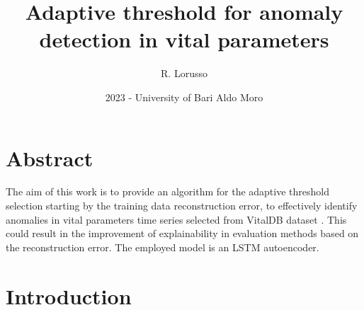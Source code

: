 \documentclass{article}
\begin{document}
	
	
\title{Adaptive threshold for anomaly detection in vital parameters}
\author{R. Lorusso}
\date{2023 - University of Bari Aldo Moro}
	
\maketitle
	
\begin{multicols*}{2}
		
\section*{Abstract}
\begin{it}

The aim of this work is to provide an algorithm for the adaptive threshold selection starting by the training data reconstruction error, to effectively identify anomalies in vital parameters time series selected from VitalDB dataset \cite{VitalDB}. This could result in the improvement of explainability in evaluation methods based on the reconstruction error. The employed model is an LSTM autoencoder. 
\end{it}
		
		
		
\section{Introduction}
		

\end{multicols*}
\end{document}
